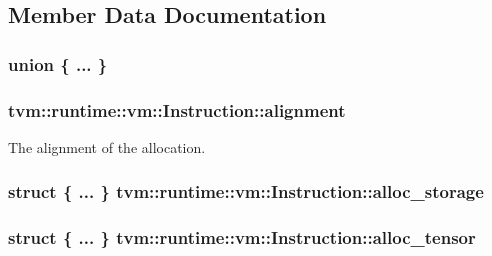 \subsection{Member Data Documentation}
\subsubsection[{\texorpdfstring{"@1}{@1}}]{\setlength{\rightskip}{0pt plus 5cm}union \{ ... \} }\hypertarget{structtvm_1_1runtime_1_1vm_1_1Instruction_a07b7eb011780c5735fc13059229bb26d}{}\label{structtvm_1_1runtime_1_1vm_1_1Instruction_a07b7eb011780c5735fc13059229bb26d}
\subsubsection[{\texorpdfstring{alignment}{alignment}}]{ tvm\+::runtime\+::vm\+::\+Instruction\+::alignment}\hypertarget{structtvm_1_1runtime_1_1vm_1_1Instruction_ad56f744402eb006b4b8ec94ccbe840c3}{}\label{structtvm_1_1runtime_1_1vm_1_1Instruction_ad56f744402eb006b4b8ec94ccbe840c3}


The alignment of the allocation. 

\subsubsection[{\texorpdfstring{alloc\+\_\+storage}{alloc_storage}}]{\setlength{\rightskip}{0pt plus 5cm}struct \{ ... \}   tvm\+::runtime\+::vm\+::\+Instruction\+::alloc\+\_\+storage}\hypertarget{structtvm_1_1runtime_1_1vm_1_1Instruction_af2ef1564cf59236e194d922633d90204}{}\label{structtvm_1_1runtime_1_1vm_1_1Instruction_af2ef1564cf59236e194d922633d90204}
\subsubsection[{\texorpdfstring{alloc\+\_\+tensor}{alloc_tensor}}]{\setlength{\rightskip}{0pt plus 5cm}struct \{ ... \}   tvm\+::runtime\+::vm\+::\+Instruction\+::alloc\+\_\+tensor}\hypertarget{structtvm_1_1runtime_1_1vm_1_1Instruction_ac0cf97d97cad4decc0c2306ad74dc958}{}\label{structtvm_1_1runtime_1_1vm_1_1Instruction_ac0cf97d97cad4decc0c2306ad74dc958}
